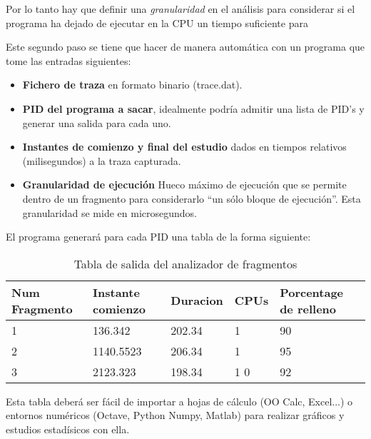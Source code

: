 \documentclass[a4paper,11pt,spanish,twoside]{article}
\begin{document}
Por lo tanto hay que definir una \emph{granularidad} en el análisis
para considerar si el programa ha dejado de ejecutar en la CPU un
tiempo suficiente para 

Este segundo paso se tiene que hacer de manera automática con un
programa que tome las entradas siguientes:

\begin{itemize}
\item \textbf{Fichero de traza} en formato binario (trace.dat).
\item \textbf{PID del programa a sacar}, idealmente podría admitir una
  lista de PID's y generar una salida para cada uno.
\item \textbf{Instantes de comienzo y final del estudio} dados en
  tiempos relativos (milisegundos) a la traza capturada.
\item \textbf{Granularidad de ejecución} Hueco máximo de ejecución que
  se permite dentro de un fragmento para considerarlo ``un sólo bloque
  de ejecución''.  Esta granularidad se mide en microsegundos.
\end{itemize}

El programa generará para cada PID una tabla de la forma siguiente:

\begin{table}[h!]
  \centering
  \begin{tabular}{p{1in}|p{1in}|p{1in}|p{1in}|p{1in}}
    \textbf{Num Fragmento} & \textbf{Instante comienzo} &
    \textbf{Duracion} & \textbf{CPUs} & \textbf{Porcentage
      de relleno} \\ \hline
1 & 136.342 & 202.34 & 1 & 90 \\
2 & 1140.5523 & 206.34 & 1 & 95 \\ 
3 & 2123.323 & 198.34 & 1 0 & 92 \\
  \end{tabular}
  \caption{Tabla de salida del analizador de fragmentos}
  \label{tab:analisis}
\end{table}

Esta tabla deberá ser fácil de importar a hojas de cálculo (OO Calc,
Excel...) o entornos numéricos (Octave, Python Numpy, Matlab) para
realizar gráficos y estudios estadísicos con ella.



% 
% 
\end{document}
